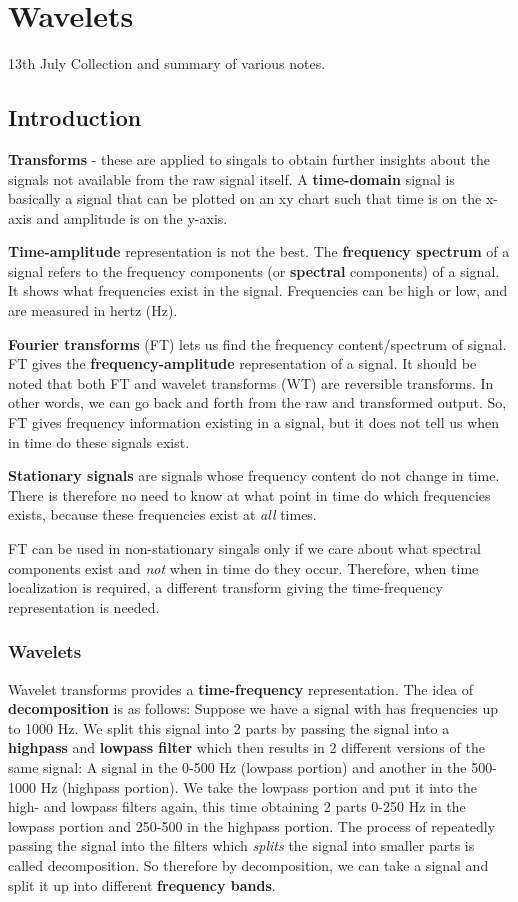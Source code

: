 \documentclass{article}
\begin{document}
	\section{Wavelets}
	13th July
	Collection and summary of various notes.
	\subsection{Introduction}
		
		\textbf{Transforms} - these are applied to singals to obtain further insights about the signals not available from the raw signal itself. A \textbf{time-domain} signal is basically a signal that can be plotted on an xy chart such that time is on the x-axis and amplitude is on the y-axis.
		
		\textbf{Time-amplitude} representation is not the best.
		The \textbf{frequency spectrum} of a signal refers to the frequency components (or \textbf{spectral} components) of a signal. It shows what frequencies exist in the signal. Frequencies can be high or low, and are measured in hertz (Hz).
		
		\textbf{Fourier transforms} (FT) lets us find the frequency content/spectrum of signal. FT gives the \textbf{frequency-amplitude} representation of a signal. 
		It should be noted that both FT and wavelet transforms (WT) are reversible transforms. In other words, we can go back and forth from the raw and transformed output. So, FT gives frequency information existing in a signal, but it does not tell us when in time do these signals exist. 
		
		\textbf{Stationary signals} are signals whose frequency content do not change in time. There is therefore no need to know at what point in time do which frequencies exists, because these frequencies exist at \textit{all} times.
		
		FT can be used in non-stationary singals only if we care about what spectral components exist and \textit{not} when in time do they occur. Therefore, when time localization is required, a different transform giving the time-frequency representation is needed.
		\subsubsection{Wavelets}
		Wavelet transforms provides a \textbf{time-frequency} representation. The idea of \textbf{decomposition} is as follows: Suppose we have a signal with has frequencies up to 1000 Hz. We split this signal into 2 parts by passing the signal into a \textbf{highpass} and \textbf{lowpass filter} which then results in 2 different versions of the same signal: A signal in the 0-500 Hz (lowpass portion) and another in the 500-1000 Hz (highpass portion). We take the lowpass portion and put it into the high- and lowpass filters again, this time obtaining 2 parts 0-250 Hz in the lowpass portion and 250-500 in the highpass portion. The process of repeatedly passing the signal into the filters which \textit{splits} the signal into smaller parts is called decomposition. So therefore by decomposition, we can take a signal and split it up into different \textbf{frequency bands}.
		
\end{document}
